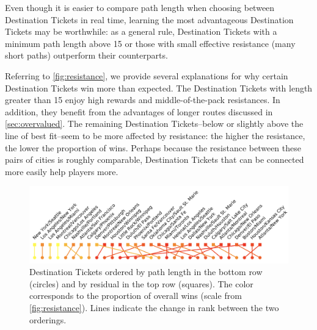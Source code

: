 Even though it is easier to compare path length when choosing
between Destination Tickets in real time,
learning the most advantageous Destination Tickets may be worthwhile:
as a general rule, Destination Tickets with a minimum path
length above 15 or those with small effective resistance
(many short paths) outperform their counterparts.

Referring to \cref{fig:resistance}, 
we provide several explanations for why certain
Destination Tickets win more than expected.
The Destination Tickets with length greater than 15 
enjoy high rewards and middle-of-the-pack 
resistances.
In addition, they benefit from the advantages of longer 
routes discussed in \cref{sec:overvalued}.
The remaining Destination Tickets--below or slightly 
above the line of best fit--seem to be more affected
by resistance: the higher the resistance, the
lower the proportion of wins.
Perhaps because the resistance between these pairs of cities
is roughly comparable, Destination Tickets that 
can be connected more easily help players more.

\begin{figure}[H]
    \centering
    \includegraphics[scale=.25]{figures/rankings2.png}
    \caption{Destination Tickets ordered by path length
    in the bottom row (circles) and by residual
    in the top row (squares). The color
    corresponds to the proportion of overall wins (scale
    from \cref{fig:resistance}).
    Lines indicate the change in rank between
    the two orderings.}
    \label{fig:rankings}
\end{figure}

